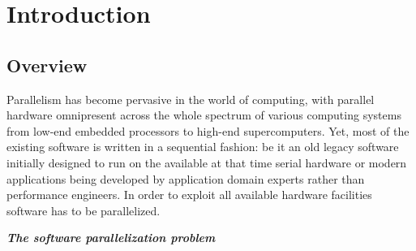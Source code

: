 \chapter{Introduction}
\label{introduction}
\section{Overview}
\label{introduction_overview}
\quad Parallelism has become pervasive in the world of computing, with parallel hardware omnipresent across the whole spectrum of various computing systems from low-end embedded processors to high-end supercomputers. Yet, most of the existing software is written in a sequential fashion: be it an old legacy software initially designed to run on the available at that time serial hardware or modern applications being developed by application domain experts rather than performance engineers. In order to exploit all available hardware facilities software has to be parallelized.
\begin{center}
\textbf{\large \textit{The software parallelization problem}}
\end{center}
